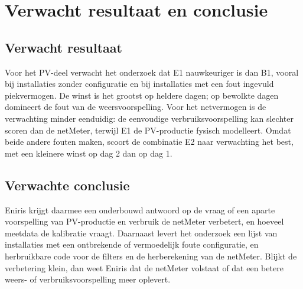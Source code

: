 \section{Verwacht resultaat en conclusie}%
\label{sec:verwachte_resultaten}

\subsection{Verwacht resultaat}

Voor het PV-deel verwacht het onderzoek dat E1 nauwkeuriger is dan B1, vooral bij installaties zonder configuratie en bij installaties met een fout ingevuld piekvermogen. De winst is het grootst op heldere dagen; op bewolkte dagen domineert de fout van de weersvoorspelling. Voor het netvermogen is de verwachting minder eenduidig: de eenvoudige verbruiksvoorspelling kan slechter scoren dan de netMeter, terwijl E1 de PV-productie fysisch modelleert. Omdat beide andere fouten maken, scoort de combinatie E2 naar verwachting het best, met een kleinere winst op dag 2 dan op dag 1.

\subsection{Verwachte conclusie}

Eniris krijgt daarmee een onderbouwd antwoord op de vraag of een aparte voorspelling van PV-productie en verbruik de netMeter verbetert, en hoeveel meetdata de kalibratie vraagt. Daarnaast levert het onderzoek een lijst van installaties met een ontbrekende of vermoedelijk foute configuratie, en herbruikbare code voor de filters en de herberekening van de netMeter. Blijkt de verbetering klein, dan weet Eniris dat de netMeter volstaat of dat een betere weers- of verbruiksvoorspelling meer oplevert.
